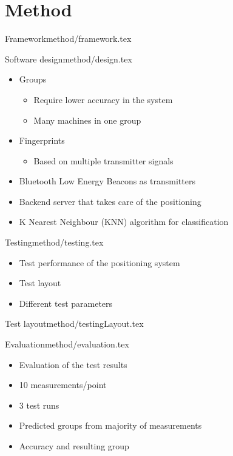 \section{Method}


\begin{notedFrame}{Framework}{method/framework.tex}
\end{notedFrame}


\begin{notedFrame}{Software design}{method/design.tex}
	\begin{itemize}
		\item Groups
    		\begin{itemize}
            	\item Require lower accuracy in the system
            	\item Many machines in one group
    		\end{itemize}
    	\item Fingerprints	
    	\begin{itemize}
    	    \item Based on multiple transmitter signals
    	\end{itemize}
		\item Bluetooth Low Energy Beacons as transmitters
		\item Backend server that takes care of the positioning
		\item K Nearest Neighbour (KNN) algorithm for classification 
	\end{itemize}
\end{notedFrame}


\begin{notedFrame}{Testing}{method/testing.tex}
	\begin{itemize}
		\item Test performance of the positioning system
		\item Test layout
		\item Different test parameters
	\end{itemize}
\end{notedFrame}


\begin{notedFrame}{Test layout}{method/testingLayout.tex}
\end{notedFrame}


\begin{notedFrame}{Evaluation}{method/evaluation.tex}
	\begin{itemize}
		\item Evaluation of the test results
		\item 10 measurements/point
		\item 3 test runs
		\item Predicted groups from majority of measurements
		\item Accuracy and resulting group
	\end{itemize}
\end{notedFrame}

